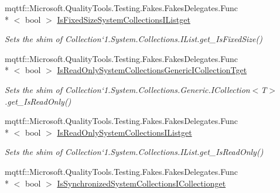 \begin{DoxyCompactItemize}
mqttf\-::\-Microsoft.\-Quality\-Tools.\-Testing.\-Fakes.\-Fakes\-Delegates.\-Func\\*
$<$ bool $>$ \hyperlink{class_system_1_1_collections_1_1_object_model_1_1_fakes_1_1_shim_collection_3_01_t_01_4_a069fd424213d43562e78d556012b182f}{Is\-Fixed\-Size\-System\-Collections\-I\-Listget}
\begin{DoxyCompactList}\small\item\em Sets the shim of Collection`1.System.\-Collections.\-I\-List.\-get\-\_\-\-Is\-Fixed\-Size()\end{DoxyCompactList}\item 
mqttf\-::\-Microsoft.\-Quality\-Tools.\-Testing.\-Fakes.\-Fakes\-Delegates.\-Func\\*
$<$ bool $>$ \hyperlink{class_system_1_1_collections_1_1_object_model_1_1_fakes_1_1_shim_collection_3_01_t_01_4_ab49971ac44b874f8ff6a51fb5ecedca2}{Is\-Read\-Only\-System\-Collections\-Generic\-I\-Collection\-Tget}
\begin{DoxyCompactList}\small\item\em Sets the shim of Collection`1.System.\-Collections.\-Generic.\-I\-Collection$<$T$>$.get\-\_\-\-Is\-Read\-Only()\end{DoxyCompactList}\item 
mqttf\-::\-Microsoft.\-Quality\-Tools.\-Testing.\-Fakes.\-Fakes\-Delegates.\-Func\\*
$<$ bool $>$ \hyperlink{class_system_1_1_collections_1_1_object_model_1_1_fakes_1_1_shim_collection_3_01_t_01_4_a32ecf17b1be89a5739db40bfdbefe410}{Is\-Read\-Only\-System\-Collections\-I\-Listget}
\begin{DoxyCompactList}\small\item\em Sets the shim of Collection`1.System.\-Collections.\-I\-List.\-get\-\_\-\-Is\-Read\-Only()\end{DoxyCompactList}\item 
mqttf\-::\-Microsoft.\-Quality\-Tools.\-Testing.\-Fakes.\-Fakes\-Delegates.\-Func\\*
$<$ bool $>$ \hyperlink{class_system_1_1_collections_1_1_object_model_1_1_fakes_1_1_shim_collection_3_01_t_01_4_ad1f2741d85e6085a2b72e7f324a2c19b}{Is\-Synchronized\-System\-Collections\-I\-Collectionget}

\end{DoxyCompactItemize}
